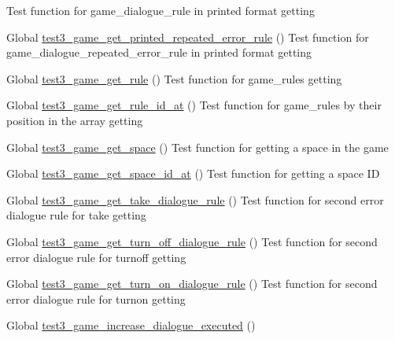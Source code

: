 \begin{DoxyRefList}
%
Test function for game\+\_\+dialogue\+\_\+rule in printed format getting  
\item[Global \mbox{\hyperlink{game__test_8c_a3797ef41df6a006fc30044b8400e9429}{test3\+\_\+game\+\_\+get\+\_\+printed\+\_\+repeated\+\_\+error\+\_\+rule}} ()]\label{test__test000323}%
%
Test function for game\+\_\+dialogue\+\_\+repeated\+\_\+error\+\_\+rule in printed format getting  
\item[Global \mbox{\hyperlink{game__test_8c_a8af5ac041194af315a8f1e3f44bbaa6e}{test3\+\_\+game\+\_\+get\+\_\+rule}} ()]\label{test__test000401}%
%
Test function for game\+\_\+rules getting  
\item[Global \mbox{\hyperlink{game__test_8c_a59d0d7fbdbeb2c8124de8b24c930ddba}{test3\+\_\+game\+\_\+get\+\_\+rule\+\_\+id\+\_\+at}} ()]\label{test__test000405}%
%
Test function for game\+\_\+rules by their position in the array getting  
\item[Global \mbox{\hyperlink{game__test_8c_a8085aae7362a755633b2f14ac6481c5d}{test3\+\_\+game\+\_\+get\+\_\+space}} ()]\label{test__test000211}%
%
Test function for getting a space in the game  
\item[Global \mbox{\hyperlink{game__test_8c_aea533d6b5e31975dd44375a2a6826e41}{test3\+\_\+game\+\_\+get\+\_\+space\+\_\+id\+\_\+at}} ()]\label{test__test000220}%
%
Test function for getting a space ID  
\item[Global \mbox{\hyperlink{game__test_8c_a261c005fd526dfce11738fea45922876}{test3\+\_\+game\+\_\+get\+\_\+take\+\_\+dialogue\+\_\+rule}} ()]\label{test__test000337}%
%
Test function for second error dialogue rule for take getting  
\item[Global \mbox{\hyperlink{game__test_8c_a17cdd56d959fe3af34b2b054264b31cd}{test3\+\_\+game\+\_\+get\+\_\+turn\+\_\+off\+\_\+dialogue\+\_\+rule}} ()]\label{test__test000363}%
%
Test function for second error dialogue rule for turnoff getting  
\item[Global \mbox{\hyperlink{game__test_8c_ac49128105d00f78a2138610d7d0ae8be}{test3\+\_\+game\+\_\+get\+\_\+turn\+\_\+on\+\_\+dialogue\+\_\+rule}} ()]\label{test__test000357}%
%
Test function for second error dialogue rule for turnon getting  
\item[Global \mbox{\hyperlink{game__test_8c_a8ebb58341c022ca622382f0a4f5c1ab3}{test3\+\_\+game\+\_\+increase\+\_\+dialogue\+\_\+executed}} ()]\label{test__test000305}%

\end{DoxyRefList}
